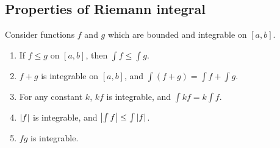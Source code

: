 \subsection{Properties of Riemann integral}
Consider functions \(f\) and \(g\) which are bounded and integrable on \([a, b]\).
\begin{enumerate}[(1)]
	\item If \(f \leq g\) on \([a, b]\), then \(\int f \leq \int g\).
	\item \(f + g\) is integrable on \([a, b]\), and \(\int (f + g) = \int f + \int g\).
	\item For any constant \(k\), \(kf\) is integrable, and \(\int kf = k\int f\).
	\item \(\abs{f}\) is integrable, and \(\abs{\int f} \leq \int \abs{f}\).
	\item \(fg\) is integrable.
\end{enumerate}
